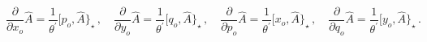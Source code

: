 \begin{equation}
{\frac{\partial }{\partial x_{o}}}\hat{A}={\frac{1}{{\theta ^{\prime }}}}
[p_{o},\hat{A}\}_{\star }\,,\quad {\frac{\partial }{\partial y_{o}}}\hat{A}={
\frac{1}{{\theta ^{\prime }}}}[q_{o},\hat{A}\}_{\star }\,,\quad {\frac{
\partial }{\partial p_{o}}}\hat{A}={\frac{1}{{\theta ^{\prime }}}}[x_{o},
\hat{A}\}_{\star }\,,\quad {\frac{\partial }{\partial q_{o}}}\hat{A}={\frac{1
}{{\theta ^{\prime }}}}[y_{o},\hat{A}\}_{\star }\,.
\end{equation}

